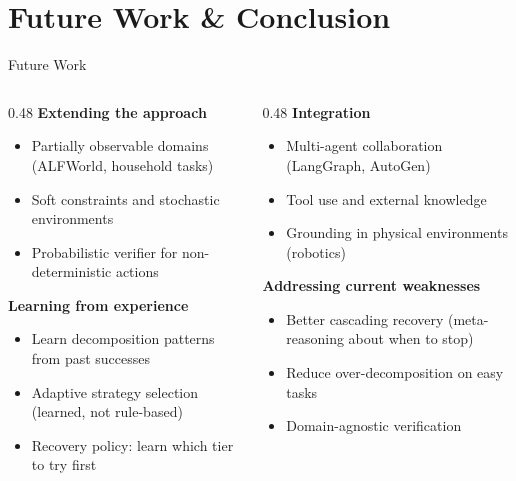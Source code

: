 \documentclass[aspectratio=169]{beamer}
\begin{document}
\section{Future Work \& Conclusion}

\begin{frame}{Future Work}

\begin{columns}[T]
\begin{column}{0.48\textwidth}
\textbf{Extending the approach}
\begin{itemize}
    \item Partially observable domains (ALFWorld, household tasks)
    \item Soft constraints and stochastic environments
    \item Probabilistic verifier for non-deterministic actions
\end{itemize}

\vspace{0.3cm}
\textbf{Learning from experience}
\begin{itemize}
    \item Learn decomposition patterns from past successes
    \item Adaptive strategy selection (learned, not rule-based)
    \item Recovery policy: learn which tier to try first
\end{itemize}
\end{column}

\begin{column}{0.48\textwidth}
\textbf{Integration}
\begin{itemize}
    \item Multi-agent collaboration (LangGraph, AutoGen)
    \item Tool use and external knowledge
    \item Grounding in physical environments (robotics)
\end{itemize}

\vspace{0.3cm}
\textbf{Addressing current weaknesses}
\begin{itemize}
    \item Better cascading recovery (meta-reasoning about when to stop)
    \item Reduce over-decomposition on easy tasks
    \item Domain-agnostic verification
\end{itemize}
\end{column}
\end{columns}

\end{frame}
\end{document}
